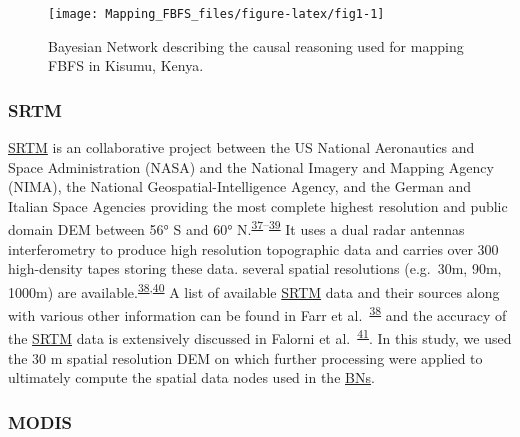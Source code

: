 \documentclass[12pt,oneside]{article}
\begin{document}
\begin{figure}[!htbp]

{\centering \texttt{[image: Mapping\_FBFS\_files/figure-latex/fig1-1]} 

}

\caption{Bayesian Network describing the causal reasoning used for mapping FBFS in Kisumu, Kenya.}\label{fig:fig1}
\end{figure}

\hypertarget{I21}{%
\subsubsection{SRTM}\label{I21}}

\href{https://www2.jpl.nasa.gov/srtm/}{SRTM} is an collaborative project between the US National Aeronautics and Space Administration (NASA) and the National Imagery and Mapping Agency (NIMA), the National Geospatial-Intelligence Agency, and the German and Italian Space Agencies providing the most complete highest resolution and public domain DEM between 56° S and 60° N.\textsuperscript{\protect\hyperlink{ref-Farr_et_al_2000}{37}--\protect\hyperlink{ref-Nikolakopoulos_et_al_2006}{39}} It uses a dual radar antennas interferometry to produce high resolution topographic data and carries over 300 high-density tapes storing these data. several spatial resolutions (e.g.~30m, 90m, 1000m) are available.\textsuperscript{\protect\hyperlink{ref-Farr_et_al_2007}{38},\protect\hyperlink{ref-Jarvis_et_al_2008}{40}} A list of available \href{https://www2.jpl.nasa.gov/srtm/}{SRTM} data and their sources along with various other information can be found in Farr et al.~\textsuperscript{\protect\hyperlink{ref-Farr_et_al_2007}{38}} and the accuracy of the \href{https://www2.jpl.nasa.gov/srtm/}{SRTM} data is extensively discussed in Falorni et al.~\textsuperscript{\protect\hyperlink{ref-Falorni_et_al_2005}{41}}. In this study, we used the 30 m spatial resolution DEM on which further processing were applied to ultimately compute the spatial data nodes used in the \href{https://en.wikipedia.org/wiki/Bayesian_network}{BNs}.

\hypertarget{I22}{%
\subsubsection{MODIS}\label{I22}}
\end{document}
